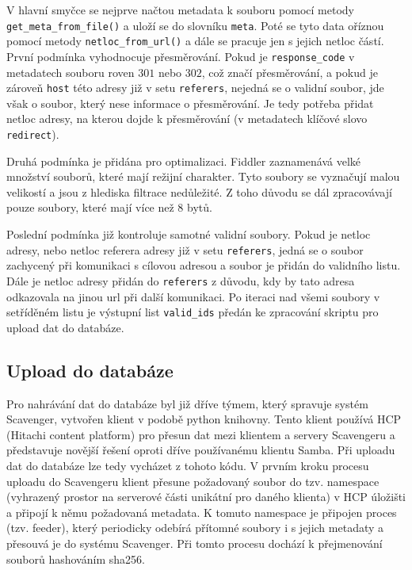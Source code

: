\documentclass[thesis=M,czech,hidelinks]{FITthesis}[2013/05/06]
\begin{document}
V hlavní smyčce se nejprve načtou metadata k souboru pomocí metody \texttt{get_meta_from_file()} a uloží se do slovníku \texttt{meta}. Poté se tyto data oříznou pomocí metody \texttt{netloc_from_url()} a dále se pracuje jen s jejich netloc částí. První podmínka vyhodnocuje přesměrování. Pokud je \texttt{response_code} v metadatech souboru roven $301$ nebo $302$, což značí přesměrování, a pokud je zároveň \texttt{host} této adresy již v setu \texttt{referers}, nejedná se o validní soubor, jde však o soubor, který nese informace o přesměrování. Je tedy potřeba přidat netloc adresy, na kterou dojde k přesměrování (v metadatech klíčové slovo \texttt{redirect}). 

Druhá podmínka je přidána pro optimalizaci. Fiddler zaznamenává velké množství souborů, které mají režijní charakter. Tyto soubory se vyznačují malou velikostí a jsou z hlediska filtrace nedůležité. Z toho důvodu se dál zpracovávají pouze soubory, které mají více než 8 bytů.

Poslední podmínka již kontroluje samotné validní soubory. Pokud je netloc adresy, nebo netloc referera adresy již v setu \texttt{referers}, jedná se o soubor zachycený při komunikaci s cílovou adresou a soubor je přidán do validního listu. Dále je netloc adresy přidán do \texttt{referers} z důvodu, kdy by tato adresa odkazovala na jinou url při další komunikaci. Po iteraci nad všemi soubory v setříděném listu je výstupní list \texttt{valid_ids} předán ke zpracování skriptu pro upload dat do databáze.





\subsection{Upload do databáze} \label{sec:upload}
Pro nahrávání dat do databáze byl již dříve týmem, který spravuje systém Scavenger, vytvořen klient v podobě python knihovny. Tento klient používá HCP (Hitachi content platform) pro přesun dat mezi klientem a servery Scavengeru a představuje novější řešení oproti dříve používanému klientu Samba. Při uploadu dat do databáze lze tedy vycházet z tohoto kódu. V prvním kroku procesu uploadu do Scavengeru klient přesune požadovaný soubor do tzv. namespace (vyhrazený prostor na serverové části unikátní pro daného klienta) v HCP úložišti a připojí k němu požadovaná metadata. K tomuto namespace je připojen proces (tzv. feeder), který periodicky odebírá přítomné soubory i s jejich metadaty a přesouvá je do systému Scavenger. Při tomto procesu dochází k přejmenování souborů hashováním sha256.
\end{document}
